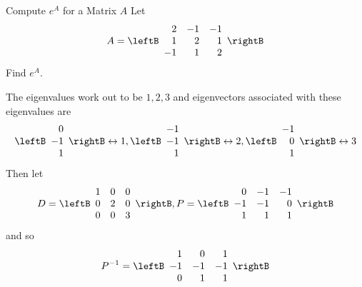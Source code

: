 \begin{example}{Compute $e^A$ for a Matrix $A$}
Let
\begin{equation*}
A=\leftB
\begin{array}{rrr}
2 & -1 & -1 \\
1 & 2 & 1 \\
-1 & 1 & 2
\end{array}
\rightB
\end{equation*}
Find $e^{A}$.
\end{example}

\begin{solution}
The eigenvalues work out to be $1,2,3$ and eigenvectors associated with these
eigenvalues are 
\begin{equation*}
\leftB 
\begin{array}{r}
0 \\ 
-1 \\ 
1
\end{array}
\rightB \leftrightarrow 1,
\leftB 
\begin{array}{r}
-1 \\ 
-1 \\ 
1
\end{array}
\rightB \leftrightarrow 2,\leftB 
\begin{array}{r}
-1 \\ 
0 \\ 
1
\end{array}
\rightB \leftrightarrow 3
\end{equation*}
Then let 
\begin{equation*}
D=\leftB 
\begin{array}{rrr}
1 & 0 & 0 \\ 
0 & 2 & 0 \\ 
0 & 0 & 3
\end{array}
\rightB, P=\leftB 
\begin{array}{rrr}
0 & -1 & -1 \\ 
-1 & -1 & 0 \\ 
1 & 1 & 1
\end{array}
\rightB
\end{equation*}
and so 
\begin{equation*}
P^{-1}=\leftB 
\begin{array}{rrr}
1 & 0 & 1 \\ 
-1 & -1 & -1 \\ 
0 & 1 & 1
\end{array}
\rightB
\end{equation*}


\end{solution}
